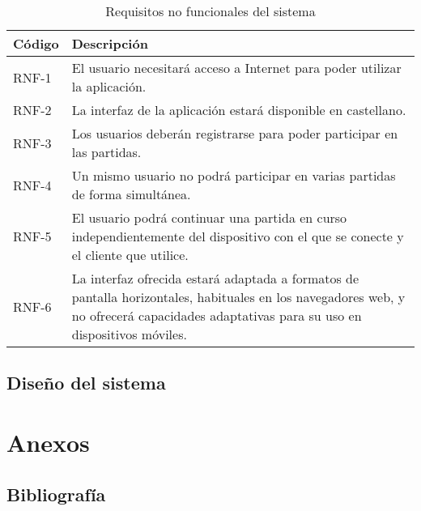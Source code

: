 \documentclass[12pt, a4paper, titlepage]{article}
\begin{document}
\begin{table}[hbt]
    \centering
    \begin{tabularx}{\textwidth}{|l|X|}
         \hline
         Código & Descripción \\
         \hline
         RNF-1 & El usuario necesitará acceso a Internet para poder utilizar la aplicación.\\
         RNF-2 & La interfaz de la aplicación estará disponible en castellano.\\
         RNF-3 & Los usuarios deberán registrarse para poder participar en las partidas.\\
         RNF-4 & Un mismo usuario no podrá participar en varias partidas de forma simultánea. \\
         RNF-5 & El usuario podrá continuar una partida en curso independientemente del dispositivo con el que se conecte y el cliente que utilice.\\
         RNF-6 & La interfaz ofrecida estará adaptada a formatos de pantalla horizontales, habituales en los navegadores web, y no ofrecerá capacidades adaptativas para su uso en dispositivos móviles.\\
         \hline
    \end{tabularx}
    \caption{Requisitos no funcionales del sistema}
    \label{tab:rnf}
\end{table}
\subsection{Diseño del sistema}




\clearpage
\section{Anexos}
\subsection{Bibliografía}

\printbibliography
\end{document}
